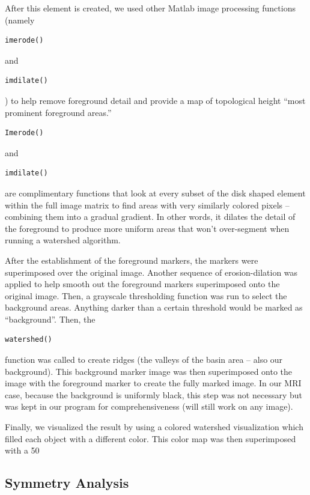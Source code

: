 \documentclass[12pt]{article}
\theoremstyle{plain}%
\theoremstyle{definition}
\theoremstyle{remark}
\begin{document}
After this element is created, we used other Matlab image processing functions (namely \begin{verbatim}imerode()\end{verbatim} and \begin{verbatim}imdilate()\end{verbatim} ) to help remove foreground detail and provide a map of topological height “most prominent foreground areas.”  \begin{verbatim}Imerode()\end{verbatim} and \begin{verbatim}imdilate()\end{verbatim} are complimentary functions that look at every subset of the disk shaped element within the full image matrix to find areas with very similarly colored pixels – combining them into a gradual gradient.  In other words, it dilates the detail of the foreground to produce more uniform areas that won’t over-segment when running a watershed algorithm. 

After the establishment of the foreground markers, the markers were superimposed over the original image.  Another sequence of erosion-dilation was applied to help smooth out the foreground markers superimposed onto the original image.  Then, a grayscale thresholding function was run to select the background areas.  Anything darker than a certain threshold would be marked as “background”.  Then, the \begin{verbatim}watershed()\end{verbatim} function was called to create ridges (the valleys of the basin area – also our background).  This background marker image was then superimposed onto the image with the foreground marker to create the fully marked image.  In our MRI case, because the background is uniformly black, this step was not necessary but was kept in our program for comprehensiveness (will still work on any image).

Finally, we visualized the result by using a colored watershed visualization which filled each object with a different color.  This color map was then superimposed with a 50%
	
\subsection{Symmetry Analysis}
\end{document}
